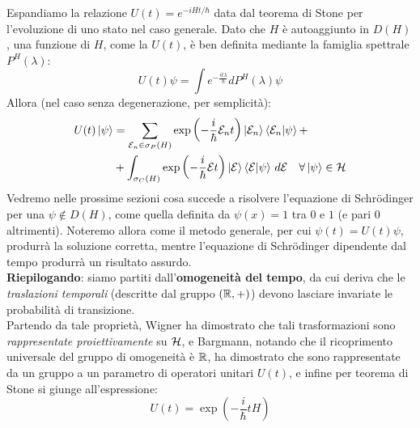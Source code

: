 \documentclass[../../FisicaTeorica.tex]{subfiles}
\begin{document}
Espandiamo la relazione $U(t) = e^{-iHt/\hbar}$ data dal teorema di Stone per l'evoluzione di uno stato nel caso generale. Dato che $H$ è autoaggiunto in $D\left(H\right)$, una funzione di $H$, come la $U(t)$, è ben definita mediante la famiglia spettrale $P^H\left(\lambda\right)$:
        \[
        U\left(t\right)\psi =\int e^{-\frac{it\lambda}{\hbar}}dP^H\left(\lambda\right)\psi 
        \]
        Allora (nel caso senza degenerazione, per semplicità):
        \begin{align}\nonumber
        U(t)\ket{\psi} &= \sum_{\mathcal{E}_n \in \sigma_P(H)} \exp\left (-\frac{i}{\hbar}\mathcal{E}_n t\right) \ket{\mathcal{E}_n}\braket{\mathcal{E}_n |\psi} +\\
        &+ 
        \int_{\sigma_C(H)} \exp\left(-\frac{i}{\hbar}\mathcal{E}t\right ) \ket{\mathcal{E}}\braket{\mathcal{E}|\psi}\, d\mathcal{E} \quad \forall \ket{\psi}\in \mathcal{H}
        \label{eqn:evoluzionetemporale_nodeg}
        \end{align}
Vedremo nelle prossime sezioni %
cosa succede a risolvere l'equazione di Schrödinger per una $\psi \notin D(H)$, come quella definita da $\psi(x)=1$ tra $0$ e $1$ (e pari $0$ altrimenti). Noteremo allora come il metodo generale, per cui $\psi(t)=U(t)\psi$, produrrà la soluzione corretta, mentre l'equazione di Schr\"odinger dipendente dal tempo produrrà un risultato assurdo.\\

\textbf{Riepilogando}: siamo partiti dall'\textbf{omogeneità del tempo}, da cui deriva che le \textit{traslazioni temporali} (descritte dal gruppo $(\mathbb{R},+)$) devono lasciare invariate le probabilità di transizione.\\
Partendo da tale proprietà, Wigner ha dimostrato che  tali trasformazioni sono \textit{rappresentate proiettivamente} su $\mathcal{H}$, e Bargmann, notando che il ricoprimento universale del gruppo di omogeneità è $\mathbb{R}$, ha dimostrato che sono rappresentate da un gruppo a un parametro di operatori unitari $U(t)$, e infine per teorema di Stone si giunge all'espressione:
\[
U(t)=\exp\left(-\frac{i}{\hbar}tH\right)
\]
\end{document}
